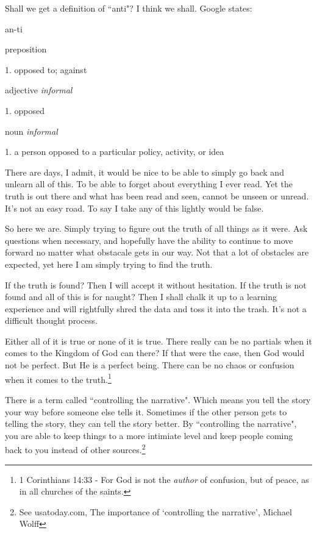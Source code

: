 \documentclass{article}
\begin{document}
Shall we get a definition of ``anti"? I think we shall. Google states:

\begin{displayquote}
an-ti

preposition

1. opposed to; against

adjective \textit{informal}

1. opposed

noun \textit{informal}

1. a person opposed to a particular policy, activity, or idea
\end{displayquote}

There are days, I admit, it would be nice to be able to simply go back and
unlearn all of this. To be able to forget about everything I ever read. Yet the
truth is out there and what has been read and seen, cannot be unseen or unread.
It's not an easy road. To say I take any of this lightly would be false.

So here we are. Simply trying to figure out the truth of all things as it were.
Ask questions when necessary, and hopefully have the ability to continue to move
forward no matter what obstacale gets in our way. Not that a lot of obstacles
are expected, yet here I am simply trying to find the truth.

If the truth is found? Then I will accept it without hesitation. If the truth is
not found and all of this is for naught? Then I shall chalk it up to a learning
experience and will rightfully shred the data and toss it into the trash. It's
not a difficult thought process.

Either all of it is true or none of it is true. There really can be no partials
when it comes to the Kingdom of God can there? If that were the case, then God
would not be perfect. But He is a perfect being. There can be no chaos or
confusion when it comes to the truth.\footnote{1 Corinthians 14:33 - For God is 
not the \textit{author} of confusion, but of peace, as in all churches of 
the saints.}

There is a term called ``controlling the narrative". Which means you tell the
story your way before someone else tells it. Sometimes if the other person gets
to telling the story, they can tell the story better. By ``controlling the
narrative",  you are able to keep things to a more intimiate level and keep
people coming back to you instead of other sources.\footnote{See usatoday.com, 
The importance of `controlling the narrative', Michael Wolff}
\end{document}
